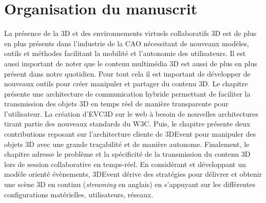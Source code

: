 
\section{Organisation du manuscrit}

La présence de la \gls{3D} et des environnements virtuels collaboratifs \gls{3D} est 
de plus en plus présents dans l'industrie de la \gls{CAO} nécessitant de nouveaux 
modèles, outils et méthodes facilitant la mobilité et l'autonomie des utilisateurs. Il 
est aussi important de noter que le contenu multimédia \gls{3D} est aussi de plus 
en plus présent dans notre quotidien. Pour tout cela il est important de développer 
de nouveaux outils pour créer manipuler et partager du contenu \gls{3D}.
Le chapitre  présente une architecture de communication hybride 
permettant de faciliter la transmission des objets \gls{3D} en temps réel de 
manière transparente pour l'utilisateur. La création d'\gls{EVC3D} sur le web à 
besoin de nouvelles architectures tirant partie des nouveaux standards du 
\gls{W3C}. Puis, le chapitre  présente deux  contributions reposant sur l'architecture cliente de 3DEvent pour 
manipuler des objets \gls{3D} avec une grande traçabilité et de manière autonome. 
Finalement, le chapitre adresse le problème et la spécificité de 
la transmission du contenu \gls{3D} lors de session collaborative en temps-réel. 
En considérant et développant un modèle orienté évènements, 3DEvent dérive 
des 
stratégies pour délivrer et obtenir une scène 3D en continu (\textit{streaming} en 
anglais) en s'appuyant sur les différentes configurations matérielles, utilisateurs, 
réseaux.